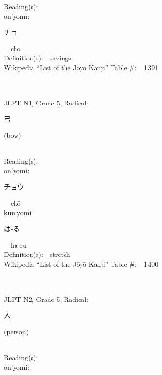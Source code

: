 \begin{multicols}{2}
Reading(s):\ \ \\
{\hspace*{1em}}on'yomi:\ \ \\
{\hspace*{2em}}{\begin{CJK}{UTF8}{min} チョ \end{CJK}}\ \ cho\ \ \\
Definition(s):\ \ savings \\
Wikipedia ``List of the J\=oy\=o Kanji'' Table \#:\ \ 1\,391 \\
\ \ \\
{\fontsize{34pt}{40pt}  }\ \ \\  %
{JLPT N1, Grade 5, Radical:\ \ {\begin{CJK}{UTF8}{min} 弓 \end{CJK}} (bow) } \\
Reading(s):\ \ \\
{\hspace*{1em}}on'yomi:\ \ \\
{\hspace*{2em}}{\begin{CJK}{UTF8}{min} チョウ \end{CJK}}\ \ ch\=o\ \ \\
{\hspace*{1em}}kun'yomi:\ \ \\
{\hspace*{2em}}{\begin{CJK}{UTF8}{min} は-る \end{CJK}}\ \ ha-ru\ \ \\
Definition(s):\ \ stretch \\
Wikipedia ``List of the J\=oy\=o Kanji'' Table \#:\ \ 1\,400 \\
\ \ \\
{\fontsize{34pt}{40pt}  }\ \ \\  %
{JLPT N2, Grade 5, Radical:\ \ {\begin{CJK}{UTF8}{min} 人 \end{CJK}} (person) } \\
Reading(s):\ \ \\
{\hspace*{1em}}on'yomi:\ \ \\

\end{multicols}
